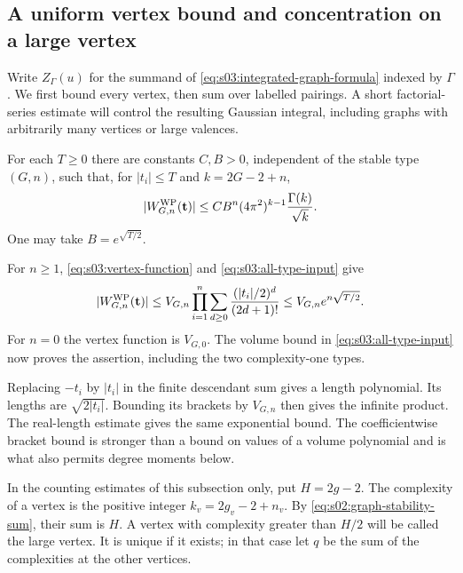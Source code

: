 \subsection{A uniform vertex bound and concentration on a large vertex}
\label{subsec:s03:03}

Write $Z_\Gamma(u)$ for the summand of
\eqref{eq:s03:integrated-graph-formula} indexed by $\Gamma$.
We first bound every vertex, then sum over labelled pairings. A short
factorial-series estimate will control the resulting Gaussian integral,
including graphs with arbitrarily many vertices or large valences.

\begin{lmm}
\label{lmm:s03:vertex-bound}
For each $T\geq0$ there are constants $C,B>0$, independent of the
stable type $(G,n)$, such that, for $|t_i|\leq T$ and $k=2G-2+n$,
\begin{equation}
\label{eq:s03:vertex-bound}
|W^{\rm WP}_{G,n}(\mathbf t)|
\leq CB^n(4\pi^2)^{k-1}\frac{\Gamma(k)}{\sqrt{k}}.
\end{equation}
One may take $B=e^{\sqrt{T/2}}$.
\end{lmm}
\begin{prf}
For $n\geq1$, \eqref{eq:s03:vertex-function} and
\eqref{eq:s03:all-type-input} give
\[
|W^{\rm WP}_{G,n}(\mathbf t)|
\leq V_{G,n}\prod_{i=1}^n
 \sum_{d\geq0}\frac{(|t_i|/2)^d}{(2d+1)!}
\leq V_{G,n}e^{n\sqrt{T/2}}.
\]
For $n=0$ the vertex function is $V_{G,0}$. The volume bound in
\eqref{eq:s03:all-type-input} now proves the assertion, including
the two complexity-one types.
\end{prf}

\begin{rmk}
Replacing $-t_i$ by $|t_i|$ in the finite descendant sum gives a
length polynomial. Its lengths are $\sqrt{2|t_i|}$.
Bounding its brackets by $V_{G,n}$ then gives the infinite product.
The real-length estimate
\cite[Lemma~14(1)]{SW25} gives the same exponential bound.
The coefficientwise bracket bound is stronger than a bound on values
of a volume polynomial and is what also permits degree moments below.
\end{rmk}

In the counting estimates of this subsection only, put $H=2g-2$.
The complexity of a vertex is the positive integer $k_v=2g_v-2+n_v$.
By \eqref{eq:s02:graph-stability-sum}, their sum is $H$.
A vertex with complexity greater than $H/2$ will be called the large
vertex. It is unique if it exists; in that case let $q$ be the sum
of the complexities at the other vertices.

